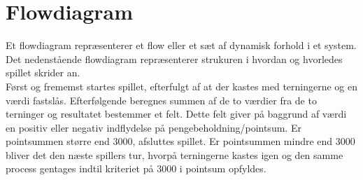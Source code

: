 \section{Flowdiagram}

\noindent Et flowdiagram repræsenterer et flow eller et sæt af dynamisk forhold i et system. Det nedenstående flowdiagram repræsenterer strukuren i hvordan og hvorledes spillet skrider an.\\

\noindent Først og frememst startes spillet, efterfulgt af at der kastes med terningerne og en værdi fastslås. Efterfølgende beregnes summen af de to værdier fra de to terninger og resultatet bestemmer et felt. Dette felt giver på baggrund af værdi en positiv eller negativ indflydelse på pengebeholdning/pointsum. Er pointsummen større end 3000, afsluttes spillet. Er pointsummen mindre end 3000 bliver det den næste spillers tur, hvorpå terningerne kastes igen og den samme process gentages indtil kriteriet på 3000 i pointsum opfyldes.\\


